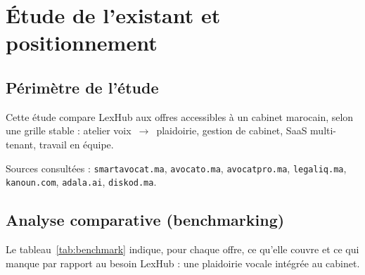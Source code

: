 \chapter{Étude de l'existant et positionnement}
\label{ch:etat-art}

\section{Périmètre de l'étude}

Cette étude compare LexHub aux offres accessibles à un cabinet marocain, selon une grille stable : atelier voix~$\rightarrow$~plaidoirie, gestion de cabinet, SaaS multi-tenant, travail en équipe.

Sources consultées : \texttt{smartavocat.ma}, \texttt{avocato.ma}, \texttt{avocatpro.ma}, \texttt{legaliq.ma}, \texttt{kanoun.com}, \texttt{adala.ai}, \texttt{diskod.ma}.

\section{Analyse comparative (benchmarking)}
\label{sec:benchmark}

Le tableau~\ref{tab:benchmark} indique, pour chaque offre, ce qu'elle couvre et ce qui manque par rapport au besoin LexHub : une plaidoirie vocale intégrée au cabinet.

